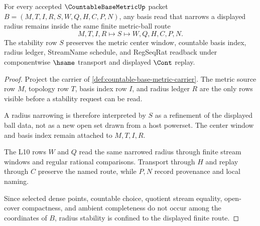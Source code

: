 \begin{theorem}
\label{thm:countable-base-metric-radius-stability}
For every accepted $\CountableBaseMetricUp$ packet $B=(M,T,I,R,S,W,Q,H,C,P,N)$, any basis read that narrows a displayed radius remains inside the same finite metric-ball route
$$
M,T,I,R \longmapsto S \longmapsto W,Q,H,C,P,N .
$$
The stability row $S$ preserves the metric center window, countable basis index, radius ledger, StreamName schedule, and RegSeqRat readback under componentwise $\hsame$ transport and displayed $\Cont$ replay.
\end{theorem}
\begin{proof}
Project the carrier of \autoref{def:countable-base-metric-carrier}. The metric source row $M$, topology row $T$, basis index row $I$, and radius ledger $R$ are the only rows visible before a stability request can be read.

A radius narrowing is therefore interpreted by $S$ as a refinement of the displayed ball data, not as a new open set drawn from a host powerset. The center window and basis index remain attached to $M,T,I,R$.

The L10 rows $W$ and $Q$ read the same narrowed radius through finite stream windows and regular rational comparisons. Transport through $H$ and replay through $C$ preserve the named route, while $P,N$ record provenance and local naming.

Since selected dense points, countable choice, quotient stream equality, open-cover compactness, and ambient completeness do not occur among the coordinates of $B$, radius stability is confined to the displayed finite route.
\end{proof}

